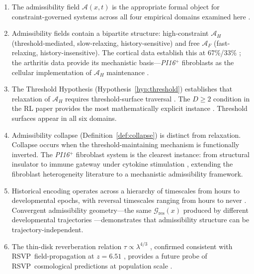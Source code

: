 \documentclass[12pt, a4paper, twoside]{book}
\theoremstyle{definition}
\theoremstyle{remark}
\newcommand{\Adm}{\mathcal{A}}
\newcommand{\RSVP}{\textsf{RSVP}}
\newcommand{\gene}[1]{\textit{#1}}
\begin{document}
\begin{enumerate}
  \item The admissibility field $\Adm(x,t)$ is the appropriate formal object for constraint-governed systems across all four empirical domains examined here \citep{driessen2026, davidson2026, spiro2026, tian2026, okitsu2026, leung2026}.

  \item Admissibility fields contain a bipartite structure: high-constraint $\Adm_H$ (threshold-mediated, slow-relaxing, history-sensitive) and free $\Adm_F$ (fast-relaxing, history-insensitive). The cortical data establish this at 67\%/33\% \citep{driessen2026}; the arthritis data provide its mechanistic basis---\gene{PI16}$^+$ fibroblasts as the cellular implementation of $\Adm_H$ maintenance \citep{davidson2026}.

  \item The Threshold Hypothesis (Hypothesis~\ref{hyp:threshold}) establishes that relaxation of $\Adm_H$ requires threshold-surface traversal \citep{driessen2026}. The $D \geq 2$ condition in the RL paper provides the most mathematically explicit instance \citep{okitsu2026}. Threshold surfaces appear in all six domains.

  \item Admissibility collapse (Definition~\ref{def:collapse}) is distinct from relaxation. Collapse occurs when the threshold-maintaining mechanism is functionally inverted. The \gene{PI16}$^+$ fibroblast system is the clearest instance: from structural insulator to immune gateway under cytokine stimulation \citep{davidson2026}, extending the fibroblast heterogeneity literature \citep{croft2019, zhang2019} to a mechanistic admissibility framework.

  \item Historical encoding operates across a hierarchy of timescales from hours to developmental epochs, with reversal timescales ranging from hours to never \citep{tononi2014, driessen2026, davidson2026}. Convergent admissibility geometry---the same $\mathcal{G}_{\mathrm{res}}(x)$ produced by different developmental trajectories \citep{davidson2026}---demonstrates that admissibility structure can be trajectory-independent.

  \item The thin-disk reverberation relation $\tau \propto \lambda^{4/3}$ \citep{shakura1973}, confirmed consistent with \RSVP\ field-propagation at $z = 6.51$ \citep{leung2026}, provides a future probe of \RSVP\ cosmological predictions at population scale \citep{fanetal2023, burke2021}.
\end{enumerate}
\end{document}
